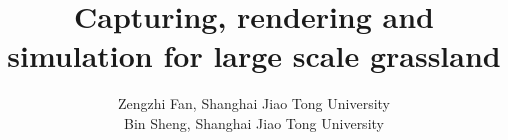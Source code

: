 \documentclass[10pt,journal,compsoc]{IEEEtran}
\begin{document}
%
\title{Capturing, rendering and simulation for large scale grassland}
%
%
%
%

\author{
Zengzhi Fan, Shanghai Jiao Tong University

Bin Sheng, Shanghai Jiao Tong University


}
\end{document}
